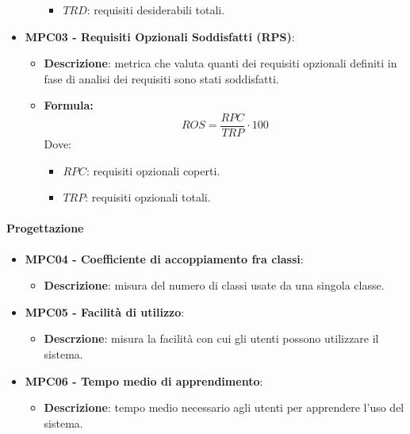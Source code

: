 \documentclass[10pt]{article}
\begin{document}
\begin{justify}
\begin{itemize}
\begin{itemize}
\begin{itemize}
                            \item $TRD$: requisiti desiderabili totali.
                        \end{itemize}
            \end{itemize}
    \item   \textbf{MPC03 - Requisiti Opzionali Soddisfatti (RPS)}:
            \begin{itemize}
                \item   \textbf{Descrizione}: metrica che valuta quanti dei requisiti opzionali definiti in fase di analisi dei requisiti sono stati soddisfatti.
                \item   \textbf{Formula:}
                        \[
                        ROS = \frac{RPC}{TRP} \cdot 100
                        \]
                        Dove:
                        \begin{itemize}
                            \item $RPC$: requisiti opzionali coperti.
                            \item $TRP$: requisiti opzionali totali.
                        \end{itemize}
            \end{itemize}
\end{itemize}

\paragraph{Progettazione}
\begin{itemize}
    \item \textbf{MPC04 - Coefficiente di accoppiamento fra classi}:
        \begin{itemize}
            \item \textbf{Descrizione}: misura del numero di classi usate da una singola classe.
        \end{itemize}
    \item \textbf{MPC05 - Facilità di utilizzo}:
        \begin{itemize}
            \item \textbf{Descrzione}: misura la facilità con cui gli utenti possono utilizzare il sistema.
        \end{itemize}
    \item \textbf{MPC06 - Tempo medio di apprendimento}:
        \begin{itemize}
            \item \textbf{Descrizione}: tempo medio necessario agli utenti per apprendere l'uso del sistema.
        \end{itemize}
\end{itemize}


\end{justify}
\end{document}
